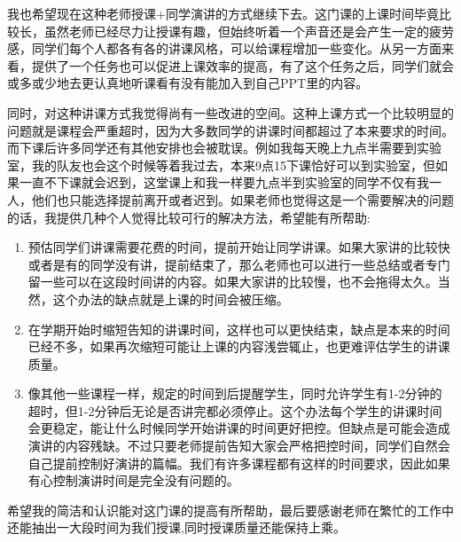 \documentclass[UTF8,9pt]{ctexart}
\newcommand{\rk}[1]{\begin{enumerate}                              %
        #1
    \end{enumerate}}
\begin{document}
我也希望现在这种老师授课+同学演讲的方式继续下去。这门课的上课时间毕竟比较长，虽然老师已经尽力让授课有趣，但始终听着一个声音还是会产生一定的疲劳感，同学们每个人都各有各的讲课风格，可以给课程增加一些变化。从另一方面来看，提供了一个任务也可以促进上课效率的提高，有了这个任务之后，同学们就会或多或少地去更认真地听课看有没有能加入到自己PPT里的内容。

同时，对这种讲课方式我觉得尚有一些改进的空间。这种上课方式一个比较明显的问题就是课程会严重超时，因为大多数同学的讲课时间都超过了本来要求的时间。而下课后许多同学还有其他安排也会被耽误。例如我每天晚上九点半需要到实验室，我的队友也会这个时候等着我过去，本来9点15下课恰好可以到实验室，但如果一直不下课就会迟到，这堂课上和我一样要九点半到实验室的同学不仅有我一人，他们也只能选择提前离开或者迟到。如果老师也觉得这是一个需要解决的问题的话，我提供几种个人觉得比较可行的解决方法，希望能有所帮助:
\rk{
    \item 预估同学们讲课需要花费的时间，提前开始让同学讲课。如果大家讲的比较快或者是有的同学没有讲，提前结束了，那么老师也可以进行一些总结或者专门留一些可以在这段时间讲的内容。如果大家讲的比较慢，也不会拖得太久。当然，这个办法的缺点就是上课的时间会被压缩。
    \item 在学期开始时缩短告知的讲课时间，这样也可以更快结束，缺点是本来的时间已经不多，如果再次缩短可能让上课的内容浅尝辄止，也更难评估学生的讲课质量。
    \item 像其他一些课程一样，规定的时间到后提醒学生，同时允许学生有1-2分钟的超时，但1-2分钟后无论是否讲完都必须停止。这个办法每个学生的讲课时间会更稳定，能让什么时候同学开始讲课的时间更好把控。但缺点是可能会造成演讲的内容残缺。不过只要老师提前告知大家会严格把控时间，同学们自然会自己提前控制好演讲的篇幅。我们有许多课程都有这样的时间要求，因此如果有心控制演讲时间是完全没有问题的。
}
希望我的简洁和认识能对这门课的提高有所帮助，最后要感谢老师在繁忙的工作中还能抽出一大段时间为我们授课,同时授课质量还能保持上乘。
\newpage
\end{document}
